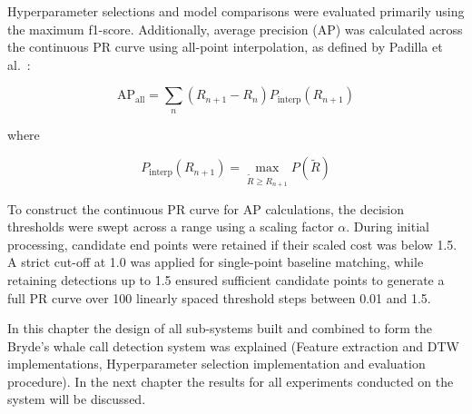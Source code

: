 Hyperparameter selections and model comparisons were evaluated primarily using the maximum f1-score. Additionally, average precision (\acs{AP}) was calculated across 
the continuous \acs{PR} curve using all-point interpolation, as defined by Padilla et al.~\cite{ap}:

\begin{equation}
    \text{AP}_{\text{all}} = \sum_{n} (R_{n+1} - R_n) P_{\text{interp}}(R_{n+1})
\end{equation}

where

\begin{equation}
    P_{\text{interp}}(R_{n+1}) = \max_{\tilde{R} \ge R_{n+1}} P(\tilde{R})
\end{equation}

To construct the continuous \acs{PR} curve for \acs{AP} calculations, the decision thresholds were swept across a range using a scaling factor $\alpha$. During initial 
processing, candidate end points were retained if their scaled cost was below 1.5. A strict cut-off at 1.0 was applied for single-point baseline matching, 
while retaining detections up to 1.5 ensured sufficient candidate points to generate a full \acs{PR} curve over 100 linearly spaced threshold steps between 0.01 
and 1.5.


In this chapter the design of all sub-systems built and combined to form the Bryde's whale call detection system was explained (Feature extraction 
and \acs{DTW} implementations, Hyperparameter selection implementation and evaluation procedure). 
In the next chapter the results for all experiments conducted on the system will be discussed.